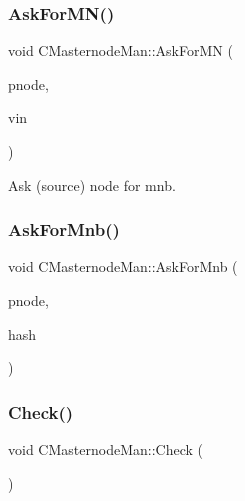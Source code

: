 \mbox{\label{class_c_masternode_man_a4399c66e350203fa10348367ff8a78d1}} 
\subsubsection{\texorpdfstring{Ask\+For\+M\+N()}{AskForMN()}}
{\footnotesize\ttfamily void C\+Masternode\+Man\+::\+Ask\+For\+MN (\begin{DoxyParamCaption}\item[{\mbox{\hyperlink{class_c_node}{C\+Node}} $\ast$}]{pnode,  }\item[{const C\+Tx\+In \&}]{vin }\end{DoxyParamCaption})}



Ask (source) node for mnb. 

\mbox{\label{class_c_masternode_man_aa900ccb8dc8ce296adda49b9b9fb7020}} 
\subsubsection{\texorpdfstring{Ask\+For\+Mnb()}{AskForMnb()}}
{\footnotesize\ttfamily void C\+Masternode\+Man\+::\+Ask\+For\+Mnb (\begin{DoxyParamCaption}\item[{\mbox{\hyperlink{class_c_node}{C\+Node}} $\ast$}]{pnode,  }\item[{const \mbox{\hyperlink{classuint256}{uint256}} \&}]{hash }\end{DoxyParamCaption})}

\mbox{\label{class_c_masternode_man_a746a5bed8674a37f69f8987a2bd9bcd1}} 
\subsubsection{\texorpdfstring{Check()}{Check()}}
{\footnotesize\ttfamily void C\+Masternode\+Man\+::\+Check (\begin{DoxyParamCaption}{ }\end{DoxyParamCaption})}




